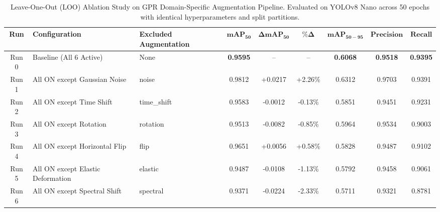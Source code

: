 \begin{table}[t]
\centering
\caption{Leave-One-Out (LOO) Ablation Study on GPR Domain-Specific Augmentation Pipeline. Evaluated on YOLOv8 Nano across 50 epochs with identical hyperparameters and split partitions.}
\label{tab:gpr_ablation}
\begin{tabular}{cllcccccc}
\hline
\textbf{Run} & \textbf{Configuration} & \textbf{Excluded Augmentation} & $\mathbf{mAP_{50}}$ & $\mathbf{\Delta mAP_{50}}$ & $\mathbf{\% \Delta}$ & $\mathbf{mAP_{50-95}}$ & $\mathbf{Precision}$ & $\mathbf{Recall}$ \\
\hline
Run 0 & Baseline (All 6 Active) & None & \textbf{0.9595} & -- & -- & \textbf{0.6068} & \textbf{0.9518} & \textbf{0.9395} \\
Run 1 & All ON except Gaussian Noise & noise & 0.9812 & +0.0217 & +2.26\% & 0.6312 & 0.9703 & 0.9391 \\
Run 2 & All ON except Time Shift & time_shift & 0.9583 & -0.0012 & -0.13\% & 0.5851 & 0.9451 & 0.9231 \\
Run 3 & All ON except Rotation & rotation & 0.9513 & -0.0082 & -0.85\% & 0.5964 & 0.9534 & 0.9003 \\
Run 4 & All ON except Horizontal Flip & flip & 0.9651 & +0.0056 & +0.58\% & 0.5828 & 0.9487 & 0.9102 \\
Run 5 & All ON except Elastic Deformation & elastic & 0.9487 & -0.0108 & -1.13\% & 0.5792 & 0.9458 & 0.9061 \\
Run 6 & All ON except Spectral Shift & spectral & 0.9371 & -0.0224 & -2.33\% & 0.5711 & 0.9321 & 0.8781 \\
\hline
\end{tabular}
\end{table}